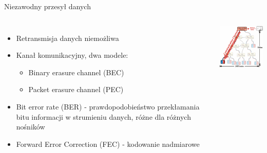 \documentclass[compress,red]{beamer}
\begin{document}
\begin{frame}{Niezawodny przesył danych}

  \begin{columns}[c]

      \begin{itemize}
	\item Retransmisja danych niemożliwa
	\item Kanał komunikacyjny, dwa modele:
	\begin{itemize}
	  \item Binary erasure channel (BEC)
	  \item Packet erasure channel (PEC)
	\end{itemize}
	\item Bit error rate (BER) - prawdopodobieństwo przekłamania bitu informacji w strumieniu danych, 
	      różne dla różnych nośników
	\item Forward Error Correction (FEC) - kodowanie nadmiarowe
      \end{itemize}

      \vspace{2cm}


      \begin{center}
      \includegraphics[width=4.5cm]{robustness/CommunicationChannel.pdf}
      \end{center}

      \vspace{2cm}

  \end{columns}

\end{frame}
\end{document}
